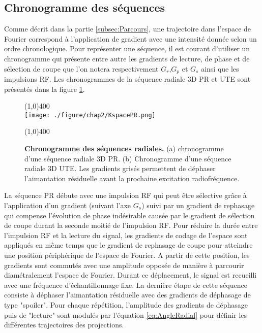 \subsection{Chronogramme des séquences}

Comme décrit dans la partie \ref{subsec:Parcours}, une trajectoire dans l'espace de Fourier correspond à l'application de gradient avec une intensité donnée selon un ordre chronologique. Pour représenter une séquence, il est courant d'utiliser un chronogramme qui présente entre autre les gradients de lecture, de phase et de sélection de coupe que l'on notera respectivement $G_r$,$G_p$ et $G_s$ ainsi que les impulsions RF. Les chronogrammes de la séquence radiale 3D PR et UTE sont présentés dans la figure \ref{fig:KspacePR}.

\begin{figure}[h]
\centering
\line(1,0){400} \\
\texttt{[image: ./figure/chap2/KspacePR.png]}
\caption[Chronogramme des séquences radiales.]{\label{fig:KspacePR} \textbf{Chronogramme des séquences radiales.} (a) chronogramme d'une séquence radiale 3D PR. (b) Chronogramme d'une séquence radiale 3D UTE. Les gradients grisés permettent de déphaser l'aimantation résiduelle avant la prochaine excitation radiofréquence.} 
\line(1,0){400} \\
\end{figure}

La séquence PR débute avec une impulsion RF qui peut être sélective grâce à l'application d'un  gradient (suivant l'axe $G_s$) suivi par un gradient de rephasage qui compense l'évolution de phase indésirable causée par le gradient de sélection de coupe durant la seconde moitié de l'impulsion RF. Pour réduire la durée entre l'impulsion RF et la lecture du signal, les gradients de codage de l'espace sont appliqués en même temps que le gradient de rephasage de coupe pour atteindre une position périphérique de l'espace de Fourier. A partir de cette position, les gradients sont commutés avec une amplitude opposée de manière à parcourir diamétralement l'espace de Fourier. Durant ce déplacement, le signal est recueilli avec une fréquence d'échantillonnage fixe. La dernière étape de cette séquence consiste à déphaser l'aimantation résiduelle avec des gradients de déphasage de type "spoiler". Pour chaque répétition, l'amplitude des gradients de déphasage puis de "lecture" sont modulés par l'équation \ref{eq:AngleRadial} pour définir les différentes trajectoires des projections.

